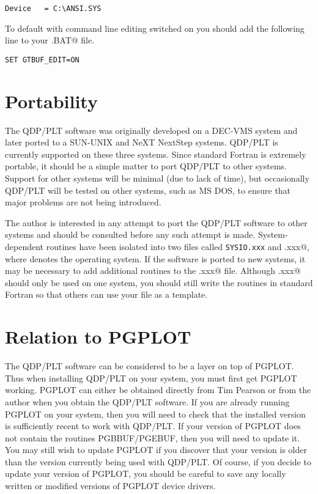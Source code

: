 \begin{verbatim}
Device   = C:\ANSI.SYS
\end{verbatim}

To default with command line editing switched on you should add
the following line to your \verb@AUTOEXEC.BAT@ file.

\begin{verbatim}
SET GTBUF_EDIT=ON
\end{verbatim}

\section{Portability}
The QDP/PLT software was originally developed on a DEC-VMS system
and later ported to a SUN-UNIX and NeXT NextStep systems.
QDP/PLT is currently supported on these three systems.
Since standard Fortran is extremely portable,
it should be a simple matter to port QDP/PLT to other systems.
Support for other systems will be minimal (due to lack of time),
but occasionally QDP/PLT will be tested on other systems,
such as MS DOS, to ensure that major problems are not being
introduced.

The author is interested in any attempt to port the QDP/PLT software
to other systems
and should be consulted before any such attempt is made.
System-dependent routines have been isolated into two files
called {\tt SYSIO.xxx} and \verb@SYS.xxx@,
where \verb@xxx@ denotes the operating system.
If the software is ported to new systems,
it may be necessary to add additional routines to the \verb@SYS.xxx@ file.
Although \verb@SYS.xxx@ should only be used on one system,
you should still write the routines in standard Fortran
so that others can use your file as a template.

\section{Relation to PGPLOT}
The QDP/PLT software can be considered to be a layer on top of PGPLOT.
Thus when installing QDP/PLT on your system,
you must first get PGPLOT working.
PGPLOT can either be obtained directly from Tim Pearson
or from the author when you obtain the QDP/PLT software.
If you are already running PGPLOT on your system,
then you will need to check that the installed version
is sufficiently recent to work with QDP/PLT.
If your version of PGPLOT does not contain the routines PGBBUF/PGEBUF,
then you will need to update it.
You may still wish to update PGPLOT if you discover
that your version is older than the version currently being used with QDP/PLT.
Of course, if you decide to update your version of PGPLOT,
you should be careful to save any locally written or modified versions
of PGPLOT device drivers.

